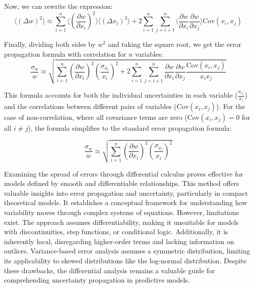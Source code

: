 \documentclass{article}
\begin{document}
Now, we can rewrite the expression:
\begin{equation}
\langle (\Delta w)^2 \rangle \approx \sum_{i=1}^{n} \langle \left(\frac{\partial w}{\partial x_i}\right)^2 \rangle \langle (\Delta x_i)^2 \rangle + 2 \sum_{i=1}^{n} \sum_{j=i+1}^{n} \langle \frac{\partial w}{\partial x_i} \frac{\partial w}{\partial x_j} \rangle \text{Cov}(x_i, x_j)
\end{equation}

Finally, dividing both sides by \(w^2\) and taking the square root, we get the error propagation formula with correlation for \( n \) variables\cite{articleb,taylor2022introduction,weisstein2000error,LUO201723}:
\begin{equation}
\frac{\sigma_w}{w} \approx \sqrt{\sum_{i=1}^{n} \left(\frac{\partial w}{\partial x_i}\right)^2 \left(\frac{\sigma_{x_i}}{x_i}\right)^2 + 2 \sum_{i=1}^{n} \sum_{j=i+1}^{n} \frac{\partial w}{\partial x_i} \frac{\partial w}{\partial x_j} \frac{\text{Cov}(x_i, x_j)}{x_i x_j}}
\end{equation}

This formula accounts for both the individual uncertainties in each variable (\( \frac{\sigma_{x_i}}{x_i} \)) and the correlations between different pairs of variables (\( \text{Cov}(x_i, x_j) \)). For the case of non-correlation, where all covariance terms are zero (\( \text{Cov}(x_i, x_j) = 0 \) for all \( i \neq j \)), the formula simplifies to the standard error propagation formula:

\begin{equation}
\frac{\sigma_w}{w} \approx \sqrt{\sum_{i=1}^{n} \left(\frac{\partial w}{\partial x_i}\right)^2 \left(\frac{\sigma_{x_i}}{x_i}\right)^2}
\end{equation}

Examining the spread of errors through differential calculus proves effective for models defined by smooth and differentiable relationships. This method offers valuable insights into error propagation and uncertainty, particularly in compact theoretical models. It establishes a conceptual framework for understanding how variability moves through complex systems of equations\cite{articleb}. However, limitations exist. The approach assumes differentiability, making it unsuitable for models with discontinuities, step functions, or conditional logic. Additionally, it is inherently local, disregarding higher-order terms and lacking information on outliers\cite{articleb}. Variance-based error analysis assumes a symmetric distribution, limiting its applicability to skewed distributions like the log-normal distribution\cite{MCKAY199944}. Despite these drawbacks, the differential analysis remains a valuable guide for comprehending uncertainty propagation in predictive models\cite{articleb,taylor2022introduction,LUO201723}.
\end{document}
